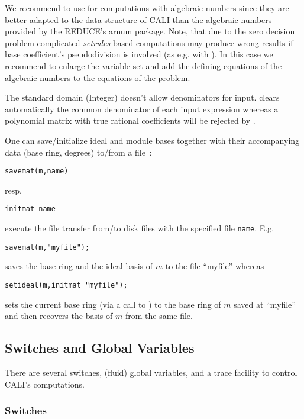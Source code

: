 We recommend to use  for computations with algebraic 
numbers since they are better adapted to the data structure of CALI 
than the algebraic numbers provided by the REDUCE's arnum package. 
Note, that due to the zero decision problem
complicated {\em setrules} based computations may produce wrong
results if base coefficient's pseudodivision is involved (as e.g.
with ). In this case we recommend to enlarge
the variable set and add the defining equations of the algebraic
numbers to the equations of the problem.
\medskip

The standard domain (Integer) doesn't allow denominators for input.
 clears automatically the common denominator of each
input expression whereas a polynomial matrix with true rational
coefficients will be rejected by .
\medskip

One can save/initialize ideal and module bases together with their
accompanying data (base ring, degrees) to/from a file~:
\begin{verbatim}
savemat(m,name)
\end{verbatim}
resp.
\begin{verbatim}
initmat name
\end{verbatim} execute the file transfer from/to disk files with the
specified file {\tt name}. E.g.
\begin{verbatim}
savemat(m,"myfile");
\end{verbatim}
saves the base ring and the ideal basis of $m$ to the file ``myfile''
whereas
\begin{verbatim}
setideal(m,initmat "myfile");
\end{verbatim}
sets the current base ring (via a call to ) to the base
ring of $m$ saved at ``myfile'' and then recovers the basis of $m$
from the same file.

\subsection{Switches and Global Variables}

There are several switches, (fluid) global variables, and a trace
facility to control CALI's computations.
\medskip

\subsubsection*{Switches}

